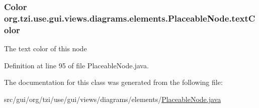 \hypertarget{classorg_1_1tzi_1_1use_1_1gui_1_1views_1_1diagrams_1_1elements_1_1_placeable_node_a875879f3e5c9d237f86c82f253f8173c}{
\subsubsection[{text\-Color}]{\setlength{\rightskip}{0pt plus 5cm}Color org.\-tzi.\-use.\-gui.\-views.\-diagrams.\-elements.\-Placeable\-Node.\-text\-Color\hspace{0.3cm}{\ttfamily [protected]}}}\label{classorg_1_1tzi_1_1use_1_1gui_1_1views_1_1diagrams_1_1elements_1_1_placeable_node_a875879f3e5c9d237f86c82f253f8173c}
The text color of this node 

Definition at line 95 of file Placeable\-Node.\-java.



The documentation for this class was generated from the following file\-:\begin{DoxyCompactItemize}
\item 
src/gui/org/tzi/use/gui/views/diagrams/elements/\hyperlink{_placeable_node_8java}{Placeable\-Node.\-java}\end{DoxyCompactItemize}
